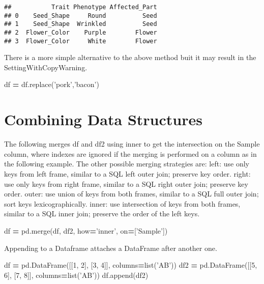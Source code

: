 \documentclass[]{book}
\newenvironment{Shaded}{\begin{snugshade}}{\end{snugshade}}
\newcommand{\DecValTok}[1]{\textcolor[rgb]{0.00,0.00,0.81}{#1}}
\newcommand{\StringTok}[1]{\textcolor[rgb]{0.31,0.60,0.02}{#1}}
\newcommand{\OperatorTok}[1]{\textcolor[rgb]{0.81,0.36,0.00}{\textbf{#1}}}
\newcommand{\BuiltInTok}[1]{#1}
\newcommand{\NormalTok}[1]{#1}
\begin{document}
\begin{verbatim}
##           Trait Phenotype Affected_Part
## 0    Seed_Shape     Round          Seed
## 1    Seed_Shape  Wrinkled          Seed
## 2  Flower_Color    Purple        Flower
## 3  Flower_Color     White        Flower
\end{verbatim}

There is a more simple alternative to the above method buit it may
result in the SettingWithCopyWarning.

\begin{Shaded}
\begin{Highlighting}[]
\NormalTok{df }\OperatorTok{=}\NormalTok{ df.replace(}\StringTok{'pork'}\NormalTok{,}\StringTok{'bacon'}\NormalTok{)}
\end{Highlighting}
\end{Shaded}

\section{Combining Data Structures}\label{combining-data-structures}

The following merges df and df2 using inner to get the intersection on
the Sample column, where indexes are ignored if the merging is performed
on a column as in the following example. The other possible merging
strategies are: left: use only keys from left frame, similar to a SQL
left outer join; preserve key order. right: use only keys from right
frame, similar to a SQL right outer join; preserve key order. outer: use
union of keys from both frames, similar to a SQL full outer join; sort
keys lexicographically. inner: use intersection of keys from both
frames, similar to a SQL inner join; preserve the order of the left
keys.

\begin{Shaded}
\begin{Highlighting}[]
\NormalTok{df }\OperatorTok{=}\NormalTok{ pd.merge(df, df2, how}\OperatorTok{=}\StringTok{'inner'}\NormalTok{, on}\OperatorTok{=}\NormalTok{[}\StringTok{'Sample'}\NormalTok{])}
\end{Highlighting}
\end{Shaded}

Appending to a Dataframe attaches a DataFrame after another one.

\begin{Shaded}
\begin{Highlighting}[]
\NormalTok{df }\OperatorTok{=}\NormalTok{ pd.DataFrame([[}\DecValTok{1}\NormalTok{, }\DecValTok{2}\NormalTok{], [}\DecValTok{3}\NormalTok{, }\DecValTok{4}\NormalTok{]], columns}\OperatorTok{=}\BuiltInTok{list}\NormalTok{(}\StringTok{'AB'}\NormalTok{))}
\NormalTok{df2 }\OperatorTok{=}\NormalTok{ pd.DataFrame([[}\DecValTok{5}\NormalTok{, }\DecValTok{6}\NormalTok{], [}\DecValTok{7}\NormalTok{, }\DecValTok{8}\NormalTok{]], columns}\OperatorTok{=}\BuiltInTok{list}\NormalTok{(}\StringTok{'AB'}\NormalTok{))}
\NormalTok{df.append(df2)}
\end{Highlighting}
\end{Shaded}
\end{document}
